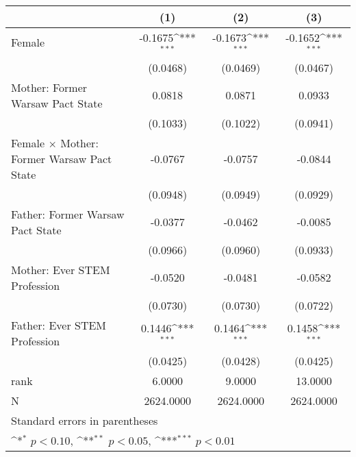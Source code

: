 {
\def\sym#1{\ifmmode^{#1}\else\(^{#1}\)\fi}
\begin{tabular}{l*{3}{c}}
\toprule
                    &\multicolumn{1}{c}{(1)}         &\multicolumn{1}{c}{(2)}         &\multicolumn{1}{c}{(3)}         \\
\midrule
Female              &     -0.1675\sym{***}&     -0.1673\sym{***}&     -0.1652\sym{***}\\
                    &    (0.0468)         &    (0.0469)         &    (0.0467)         \\
\addlinespace
Mother: Former Warsaw Pact State&      0.0818         &      0.0871         &      0.0933         \\
                    &    (0.1033)         &    (0.1022)         &    (0.0941)         \\
\addlinespace
Female $\times$ Mother: Former Warsaw Pact State&     -0.0767         &     -0.0757         &     -0.0844         \\
                    &    (0.0948)         &    (0.0949)         &    (0.0929)         \\
\addlinespace
Father: Former Warsaw Pact State&     -0.0377         &     -0.0462         &     -0.0085         \\
                    &    (0.0966)         &    (0.0960)         &    (0.0933)         \\
\addlinespace
Mother: Ever STEM Profession&     -0.0520         &     -0.0481         &     -0.0582         \\
                    &    (0.0730)         &    (0.0730)         &    (0.0722)         \\
\addlinespace
Father: Ever STEM Profession&      0.1446\sym{***}&      0.1464\sym{***}&      0.1458\sym{***}\\
                    &    (0.0425)         &    (0.0428)         &    (0.0425)         \\
\midrule
rank                &      6.0000         &      9.0000         &     13.0000         \\
N                   &   2624.0000         &   2624.0000         &   2624.0000         \\
\bottomrule
\multicolumn{4}{l}{\footnotesize Standard errors in parentheses}\\
\multicolumn{4}{l}{\footnotesize \sym{*} \(p<0.10\), \sym{**} \(p<0.05\), \sym{***} \(p<0.01\)}\\
\end{tabular}
}
